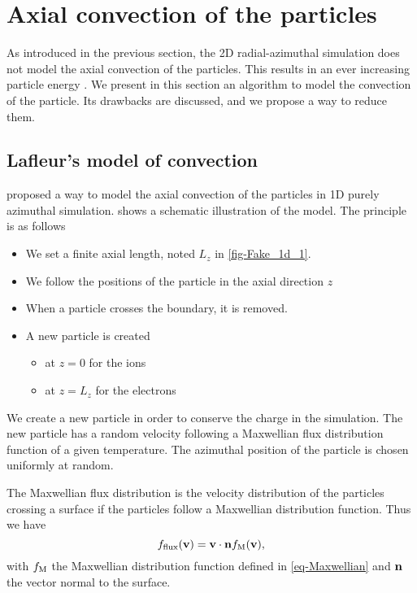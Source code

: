 
\section{Axial convection of the particles}
  \label{sec-reinjectionnoise}

  As introduced in the previous section, the \ac{2D} radial-azimuthal simulation does not model the axial convection of the particles.
  This results in an ever increasing particle energy \citep{lafleur2016a,heron2013}.
  We present in this section an algorithm to model the convection of the particle.
  Its drawbacks are discussed, and we propose a way to reduce them.
  
  \subsection{Lafleur's model of convection}

    \citet{lafleur2016a} proposed a way to model the axial convection of the particles in \ac{1D} purely azimuthal simulation.
     shows a schematic illustration of the model.
    The principle is as follows
    \begin{itemize}
      \item We set a finite axial length, noted $L_z$ in \cref{fig-Fake_1d_1}.
      \item We follow the positions of the particle in the axial direction $z$
      \item When a particle crosses the boundary, it is removed.
      \item A new particle is created
      \begin{itemize}
        \item at $z=0$ for the ions
        \item  at $z=L_z$ for the electrons
      \end{itemize}
    \end{itemize}

    We create a new particle in order to conserve the charge in the simulation.
    The new particle has a random velocity following a Maxwellian flux distribution function of a given temperature.
    The azimuthal position of the particle is chosen uniformly at random.

    The Maxwellian flux distribution is the velocity distribution of the particles crossing a surface if the particles follow a Maxwellian distribution function. Thus we have
    \begin{equation} \label{eq-Maxwflux} 
      f_{\rm flux}({\mathbf v}) = {\mathbf v} \cdot {\mathbf n} f_{\rm M}({\mathbf v}),
    \end{equation}
    with $f_{\rm M}$ the Maxwellian distribution function defined in \cref{eq-Maxwellian} and ${\mathbf n}$ the vector normal to the surface.

